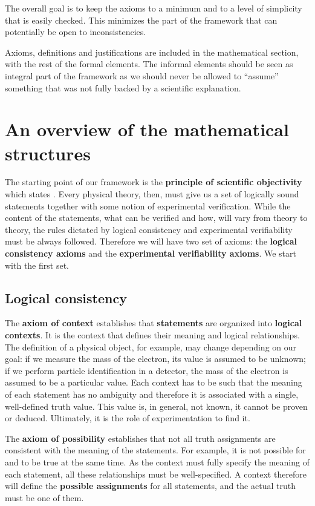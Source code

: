 \documentclass[twocolumn]{article}
\begin{document}
The overall goal is to keep the axioms to a minimum and to a level of simplicity that is easily checked. This minimizes the part of the framework that can potentially be open to inconsistencies.

Axioms, definitions and justifications are included in the mathematical section, with the rest of the formal elements. The informal elements should be seen as integral part of the framework as we should never be allowed to ``assume'' something that was not fully backed by a scientific explanation.

\section{An overview of the mathematical structures}

The starting point of our framework is the \textbf{principle of scientific objectivity} which states . Every physical theory, then, must give us a set of logically sound statements together with some notion of experimental verification. While the content of the statements, what can be verified and how, will vary from theory to theory, the rules dictated by logical consistency and experimental verifiability must be always followed. Therefore we will have two set of axioms: the \textbf{logical consistency axioms} and the \textbf{experimental verifiability axioms}. We start with the first set.

\subsection{Logical consistency}

The \textbf{axiom of context} establishes that \textbf{statements} are organized into \textbf{logical contexts}. It is the context that defines their meaning and logical relationships. The definition of a physical object, for example, may change depending on our goal: if we measure the mass of the electron, its value is assumed to be unknown; if we perform particle identification in a detector, the mass of the electron is assumed to be a particular value. Each context has to be such that the meaning of each statement has no ambiguity and therefore it is associated with a single, well-defined truth value. This value is, in general, not known, it cannot be proven or deduced. Ultimately, it is the role of experimentation to find it.

The \textbf{axiom of possibility} establishes that not all truth assignments are consistent with the meaning of the statements. For example, it is not possible for  and  to be true at the same time. As the context must fully specify the meaning of each statement, all these relationships must be well-specified. A context therefore will define the \textbf{possible assignments} for all statements, and the actual truth must be one of them.
\end{document}
